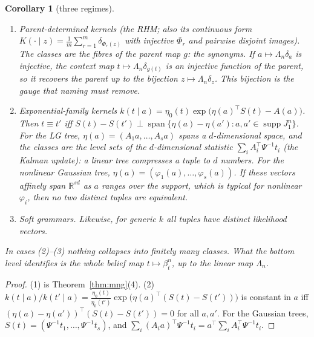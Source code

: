 \documentclass[11pt]{article}
\newtheorem{corollary}[theorem]{Corollary}
\theoremstyle{definition}
\newcommand{\R}{\mathbb R}
\begin{document}
\begin{corollary}[three regimes]\label{cor:regimes}
\begin{enumerate}
\item \emph{Parent-determined kernels} (the RHM; also its continuous form
$K(\cdot\mid z)=\frac1m\sum_{r=1}^m\delta_{\Phi_r(z)}$ with injective $\Phi_r$ and pairwise disjoint
images). The classes are the fibres of the parent map $g$: the synonyms. If
$a\mapsto\Lambda_n\delta_a$ is injective, the context map $t\mapsto\Lambda_n\delta_{g(t)}$ is an
injective function of the parent, so it recovers the parent up to the bijection
$z\mapsto\Lambda_n\delta_z$. This bijection is the \emph{gauge} that naming must remove.
\item \emph{Exponential-family kernels} $k(t\mid a)=\eta_0(t)\exp\big(\eta(a)^{\!\top}S(t)-A(a)\big)$.
Then $t\equiv t'$ iff $S(t)-S(t')\perp\operatorname{span}\{\eta(a)-\eta(a'):a,a'\in\operatorname{supp}J^n_1\}$.
For the LG tree, $\eta(a)=(A_1a,\dots,A_sa)$ spans a $d$-dimensional space, and the classes are the
level sets of the $d$-dimensional statistic $\sum_iA_i^{\!\top}\Psi^{-1}t_i$ (the Kalman update):
a linear tree compresses a tuple to $d$ numbers. For the nonlinear Gaussian tree,
$\eta(a)=(\varphi_1(a),\dots,\varphi_s(a))$. If these vectors affinely span $\R^{sd}$ as $a$ ranges
over the support, which is typical for nonlinear $\varphi_i$, then no two distinct tuples are
equivalent.
\item \emph{Soft grammars.} Likewise, for generic $k$ all tuples have distinct likelihood
vectors.
\end{enumerate}
In cases (2)--(3) nothing collapses into finitely many classes. What the bottom level identifies
is the whole belief map $t\mapsto\beta^n_t$, up to the linear map $\Lambda_n$.
\end{corollary}
\begin{proof}
(1) is Theorem~\ref{thm:mng}(4). (2) $k(t\mid a)/k(t'\mid a)=\frac{\eta_0(t)}{\eta_0(t')}
\exp\big(\eta(a)^{\!\top}(S(t)-S(t'))\big)$ is constant in $a$ iff
$(\eta(a)-\eta(a'))^{\!\top}(S(t)-S(t'))=0$ for all $a,a'$. For the Gaussian trees,
$S(t)=(\Psi^{-1}t_1,\dots,\Psi^{-1}t_s)$, and $\sum_i(A_ia)^{\!\top}\Psi^{-1}t_i=a^{\!\top}\sum_iA_i^{\!\top}\Psi^{-1}t_i$.
\end{proof}
\end{document}
